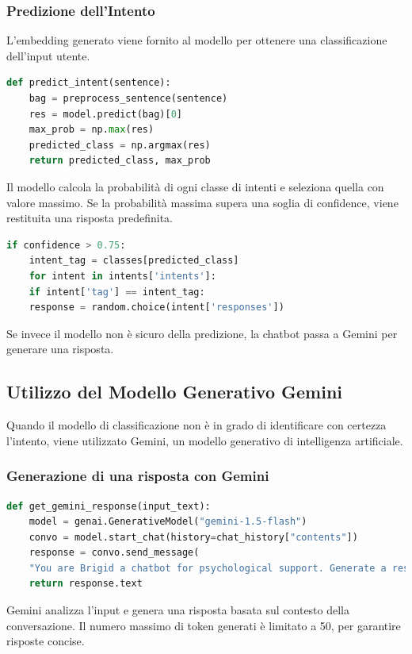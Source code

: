 \documentclass[12pt, letterpaper]{article}
\begin{document}
\subsubsection{Predizione dell'Intento}
L'embedding generato viene fornito al modello per ottenere una classificazione dell'input utente.

\begin{lstlisting}[language=Python]
	def predict_intent(sentence):
	bag = preprocess_sentence(sentence)
	res = model.predict(bag)[0]
	max_prob = np.max(res)
	predicted_class = np.argmax(res)
	return predicted_class, max_prob
\end{lstlisting}
Il modello calcola la probabilità di ogni classe di intenti e seleziona quella con valore massimo. Se la probabilità massima supera una soglia di confidence, viene restituita una risposta predefinita.
\begin{lstlisting}[language=Python]
	if confidence > 0.75:
	intent_tag = classes[predicted_class]
	for intent in intents['intents']:
	if intent['tag'] == intent_tag:
	response = random.choice(intent['responses'])
\end{lstlisting}
Se invece il modello non è sicuro della predizione, la chatbot passa a Gemini per generare una risposta.

\subsection{Utilizzo del Modello Generativo Gemini}
Quando il modello di classificazione non è in grado di identificare con certezza l'intento, viene utilizzato Gemini, un modello generativo di intelligenza artificiale.

\subsubsection{Generazione di una risposta con Gemini}
\begin{lstlisting}[language=Python]
	def get_gemini_response(input_text):
	model = genai.GenerativeModel("gemini-1.5-flash")
	convo = model.start_chat(history=chat_history["contents"])
	response = convo.send_message(
	"You are Brigid a chatbot for psychological support. Generate a response of max 200 character for:" + input_text)
	return response.text
\end{lstlisting}
Gemini analizza l'input e genera una risposta basata sul contesto della conversazione. Il numero massimo di token generati è limitato a 50, per garantire risposte concise.
\end{document}

